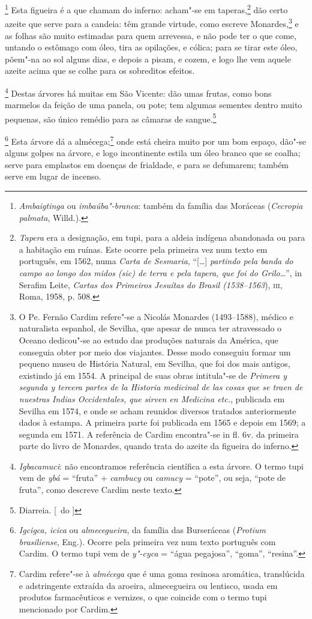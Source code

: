 \footnote{ \textit{Ambaigtinga} ou
\textit{imbaúba"-branca}: também da família das Moráceas
(\textit{Cecropia palmata}, Willd.).} Esta figueira é a
que chamam do inferno: acham"-se em taperas,\footnote{ \textit{Tapera}
era a designação, em tupi, para a aldeia indígena abandonada ou para a
habitação em ruínas. Este ocorre pela primeira vez num texto em
português, em 1562, numa \textit{Carta de Sesmaria}, ``[\ldots{}] 
\textit{partindo pela banda do campo ao longo dos midos (sic) de terra
e pela tapera, que foi do Grilo}\ldots{}'', in Serafim Leite,
\textit{Cartas dos Primeiros Jesuítas do Brasil (1538--1563}), \textsc{iii},
Roma, 1958, p. 508.} dão certo azeite que serve para a candeia: têm
grande virtude, como escreve Monardes,\footnote{ O Pe. Fernão Cardim
refere"-se a Nicolás Monardes (1493--1588), médico e naturalista espanhol, de Sevilha, 
que apesar de nunca ter atravessado o Oceano dedicou"-se ao
estudo das produções naturais da América, que conseguia obter por meio
dos viajantes. Desse modo conseguiu formar um pequeno museu de
História Natural, em Sevilha, que foi dos mais antigos, existindo já em
1554. A principal de suas obras intitula"-se de \textit{Primera y
segunda y tercera partes de la Historia medicinal de las cosas que se
traen de nuestras Indias Occidentales, que sirven en Medicina etc.}, 
publicada em Sevilha em 1574, e onde se acham reunidos diversos
tratados anteriormente dados à estampa. A primeira parte foi publicada
em 1565 e depois em 1569; a segunda em 1571. A referência de Cardim
encontra"-se in fl. 6v. da primeira parte do livro de Monardes, quando
trata do azeite da figueira do inferno.} e as folhas são muito
estimadas para quem arrevessa, e não pode ter o que come, untando o
estômago com óleo, tira as opilações, e cólica; para se tirar este
óleo, põem"-na ao sol alguns dias, e depois a pisam, e cozem, e logo lhe
vem aquele azeite acima que se colhe para os sobreditos efeitos. 

\footnote{ \textit{Igbacamuci}: não encontramos
referência científica a esta árvore. O termo tupi vem de
\textit{ybá} = ``fruta'' + \textit{cambucy} ou \textit{camucy} = ``pote'',
ou seja, ``pote de fruta'', como descreve Cardim neste texto.} 
Destas árvores há muitas em São Vicente: dão umas frutas,
como bons marmelos da feição de uma panela, ou pote; tem algumas
sementes dentro muito pequenas, são único remédio para as câmaras de sangue.\footnote{ Diarreia. [~do ]}

\footnote{ \textit{Igcigca, icica} ou
\textit{almecegueira}, da família das Burseráceas (\textit{Protium
brasiliense}, Eng.). Ocorre pela primeira vez num texto português com
Cardim. O termo tupi vem de \textit{y"-cyca} = ``água pegajosa'', ``goma'',
``resina''.} Esta árvore dá a almécega;\footnote{ Cardim
refere"-se à \textit{almécega} que é uma goma resinosa aromática,
translúcida e adstringente extraída da aroeira, almecegueira ou
lentisco, usada em produtos farmacêuticos e vernizes, o que coincide
com o termo tupi mencionado por Cardim.} onde está cheira muito por um
bom espaço, dão"-se alguns golpes na árvore, e logo incontinente estila
um óleo branco que se coalha; serve para emplastos em doenças de
frialdade, e para se defumarem; também serve em lugar de incenso.

